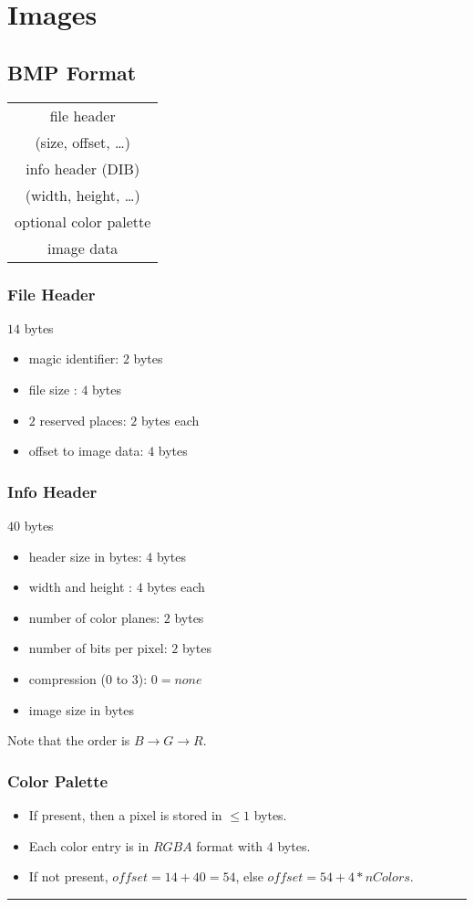 \section{Images}
\subsection{BMP Format}
\begin{tabular}{|c|}
  \hline
  file header\\
  (size, offset, \dots)\\
  \hline
  info header (DIB)\\
  (width, height, \dots)\\
  \hline
  optional color palette\\
  \hline
  image data\\
  \hline
\end{tabular}
\subsubsection{File Header}
$14$ bytes
\begin{itemize}
  \item magic identifier: $2$ bytes
  \item file size : $4$ bytes
  \item $2$ reserved places: $2$ bytes each
  \item offset to image data: $4$ bytes
\end{itemize}
\subsubsection{Info Header}
$40$ bytes
\begin{itemize}
  \item header size in bytes: $4$ bytes
  \item width and height : $4$ bytes each
  \item number of color planes: $2$ bytes
  \item number of bits per pixel: $2$ bytes
  \item compression (0 to 3): $0 = none$
  \item image size in bytes
\end{itemize}
{\color{red} Note that the order is $B \rightarrow G \rightarrow R$.}
\subsubsection{Color Palette}
\begin{itemize}
  \item If present, then a pixel is stored in $\leq 1$ bytes.
  \item Each color entry is in $RGBA$ format with $4$ bytes.
  \item If not present, $offset = 14+40 =54$, else $offset=54+4*nColors$.
\end{itemize}
\hrule
